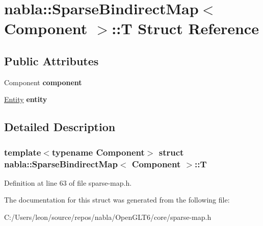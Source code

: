 \hypertarget{structnabla_1_1_sparse_bindirect_map_1_1_t}{}\section{nabla\+::Sparse\+Bindirect\+Map$<$ Component $>$\+::T Struct Reference}
\label{structnabla_1_1_sparse_bindirect_map_1_1_t}
\subsection*{Public Attributes}
\begin{DoxyCompactItemize}
\item 
\mbox{\label{structnabla_1_1_sparse_bindirect_map_1_1_t_a0ec89f2e1fcd7de843af75e50e74546b}} 
Component {\bfseries component}
\item 
\mbox{\label{structnabla_1_1_sparse_bindirect_map_1_1_t_ad4b8ff4b753d8a6bfc63fa6c2e75f3cf}} 
\mbox{\hyperlink{structnabla_1_1_entity}{Entity}} {\bfseries entity}
\end{DoxyCompactItemize}


\subsection{Detailed Description}
\subsubsection*{template$<$typename Component$>$\newline
struct nabla\+::\+Sparse\+Bindirect\+Map$<$ Component $>$\+::T}



Definition at line 63 of file sparse-\/map.\+h.



The documentation for this struct was generated from the following file\+:\begin{DoxyCompactItemize}
\item 
C\+:/\+Users/leon/source/repos/nabla/\+Open\+G\+L\+T6/core/sparse-\/map.\+h\end{DoxyCompactItemize}
